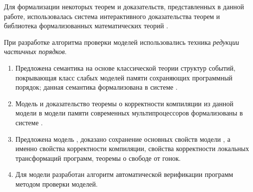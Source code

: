 Для формализации некоторых теорем и доказательств, представленных в данной работе, 
использовалась система интерактивного доказательства теорем \coq 
и библиотека формализованных математических теорий \mathcomp.

При разработке алгоритма проверки моделей использовались техника \emph{редукции частичных порядков}.

{}
\begin{enumerate}[beginpenalty=10000] %
  \item Предложена семантика на основе классической теории структур событий, 
    покрывающая класс слабых моделей памяти сохраняющих программный порядок;
    данная семантика формализована в системе \coq.
  \item Модель \Wkm и доказательство теоремы о корректности компиляции
    из данной модели в модели памяти современных мультипроцессоров формализованы в системе \coq.
  \item Предложена модель \WkmS, доказано сохранение основных свойств модели \Wkm,
    а именно свойства корректности компиляции,
    свойства корректности локальных трансформаций программ,
    теоремы о свободе от гонок.
  \item Для модели \WkmS разработан алгоритм автоматической 
    верификации программ методом проверки моделей.
\end{enumerate}

